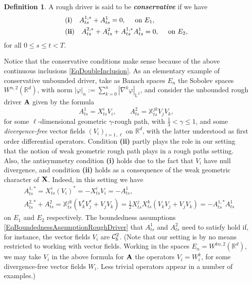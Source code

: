 \documentclass[11pt,a4paper]{amsart}
\newcommand{\RR}{\mathbb{R}}  \newcommand{\CC}{\mathbb{C}}  \newcommand{\LL}{\mathbb{L}}  \newcommand{\WW}{\mathbb{W}}
\newcommand{\bbX}{\mathbb{X}}
\renewcommand{\leq}{\leqslant}
\theoremstyle{plain}%
\theoremstyle{definition}
\newtheorem{definition}[theorem]{Definition}
\theoremstyle{remark}
\numberwithin{equation}{section} %
\begin{document}
\begin{definition}
A rough driver is said to be \textbf{\emph{conservative}} if we have 
\begin{equation*}
\begin{split}
&{\bf (i)}\quad A^{1,*}_{ts} +A^1_{ts} = 0, \quad \textrm{ on } E_1, \\
&{\bf (ii)}\quad A^{2,*}_{ts} + A^2_{ts} + A_{ts}^{1,*}  A^1_{ts} = 0, \quad \textrm{ on } E_2,
\end{split}
\end{equation*}
for all $0\leq s\leq t<T$.
\end{definition}
Notice that the conservative conditions make sense because of the above continuous inclusions \eqref{EqDoubleInclusion}. As an elementary example of conservative unbounded driver, take as Banach spaces $E_n$ the Sobolev spaces $W^{n,2}(\RR^d)$, with norm $|\varphi|_n := \sum_{k=0}^n |\nabla^k\varphi|_{\LL^2}$, and consider the unbounded rough driver $\bf A$  given by the formula
\begin{equation}
\label{EqRoughDriverRoughPath}
A^1_{ts} = X^i_{ts}V_i,  \quad\quad A^2_{ts} = \bbX^{jk}_{ts}V_jV_k,
\end{equation}
for some $\ell$-dimensional geometric $\gamma$-rough path, with $\frac{1}{3}<\gamma\leq 1$, and some \emph{divergence-free} vector fields $(V_i)_{i=1..\ell}$ on $\RR^d$, with the latter understood as first order differential operators. Condition {\bf (ii)} partly plays the role in our setting that the notion of weak geometric rough path plays in a rough paths setting. Also, the antisymmetry condition {\bf (i)} holds due to the fact that $V_i$ have null divergence, and condition {\bf (ii)} holds as a consequence of the weak geometric character of ${\bf X}$. Indeed, in this setting we have
\begin{equation*}
\begin{split}
&A^{1,*}_{ts} = X^i_{ts}(V_i)^* = - X^i_{ts} V_i = -A^1_{ts}, \\
&A^{2,*}_{ts} + A^2_{ts} =  \bbX^{jk}_{ts}(V_k^*V_j^*+V_j V_k) = \frac1 2  X^j_{ts}X^k_{ts} (V_kV_j +V_j V_k) = - A^{1,*}_{ts} A^1_{ts}
\end{split}
\end{equation*}
on $E_1$ and $E_2$ respectively. The boundedness assumptions \eqref{EqBoundednessAssumptionRoughDriver} that $A^1_{ts}$ and $A^2_{ts}$ need to satisfy hold if, for instance, the vector fields $V_i$ are $\mathcal{C}^2_b$. (Note that our setting is by no means restricted to working with vector fields. Working in the spaces $E_n = W^{kn,2}(\RR^d)$, we may take $V_i$ in the above formula for $\bf A$ the operators $V_i=W_i^k$, for some divergence-free vector fields $W_i$. Less trivial operators appear in a number of examples.)
\end{document}
